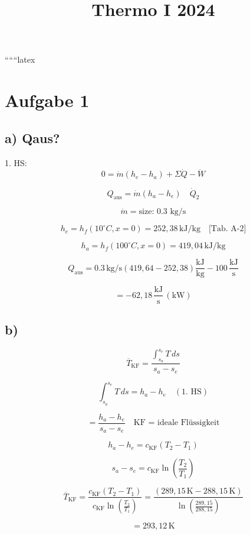 
``````latex

\title{Thermo I 2024}
\date{}


\maketitle

\section*{Aufgabe 1}

\subsection*{a) Qaus?}

1. HS:
\[
0 = \dot{m}(h_e - h_a) + \Sigma \dot{Q} - \dot{W}
\]

\[
Q_{\text{aus}} = \dot{m}(h_a - h_e) \quad \dot{Q}_2
\]

\[
\dot{m} = \text{size: 0.3 kg/s}
\]

\[
h_e = h_f(10^\circ C, x=0) = 252,38 \, \text{kJ/kg} \quad \text{[Tab. A-2]}
\]

\[
h_a = h_f(100^\circ C, x=0) = 419,04 \, \text{kJ/kg}
\]

\[
Q_{\text{aus}} = 0.3 \, \text{kg/s} \left( 419,64 - 252,38 \right) \frac{\text{kJ}}{\text{kg}} - 100 \, \frac{\text{kJ}}{\text{s}}
\]

\[
= -62,18 \, \frac{\text{kJ}}{\text{s}} \, (\text{kW})
\]

\subsection*{b)}

\[
\overline{T}_{\text{KF}} = \frac{\int_{s_a}^{s_e} T \, ds}{s_a - s_e}
\]

\[
\int_{s_a}^{s_e} T \, ds = h_a - h_e \quad (\text{1. HS})
\]

\[
= \frac{h_a - h_e}{s_a - s_e} \quad \text{KF = ideale Flüssigkeit}
\]

\[
h_a - h_e = c_{\text{KF}} (T_2 - T_1)
\]

\[
s_a - s_e = c_{\text{KF}} \ln \left( \frac{T_2}{T_1} \right)
\]

\[
\overline{T}_{\text{KF}} = \frac{c_{\text{KF}} (T_2 - T_1)}{c_{\text{KF}} \ln \left( \frac{T_2}{T_1} \right)} = \frac{(289,15 \, \text{K} - 288,15 \, \text{K})}{\ln \left( \frac{289,15}{288,15} \right)}
\]

\[
= 293,12 \, \text{K}
\]

